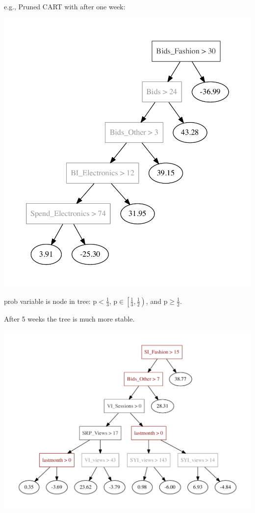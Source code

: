 \documentclass[11pt,xcolor=svgnames]{beamer}
\newcommand{\mr}[1]{\mathrm{#1}}
\begin{document}
\begin{frame}


e.g., Pruned CART with after one week:
\begin{center}
\includegraphics[width=.5\textwidth]{graphs/samptree_week1}
\end{center}
\hfill prob variable is node in tree: {\color{black!50} $\mr{p} <\tfrac{1}{3}$},
{\color{black!75}  $\mr{p} \in
\left[\tfrac{1}{3},\tfrac{1}{2}\right)$}, and {\color{DarkRed}  $\mr{p}
\geq \tfrac{1}{2}$}.
\end{frame}

\begin{frame}

After 5 weeks the tree is much more stable.
\begin{center}
\includegraphics[width=.9\textwidth]{graphs/samptree_week5}
\end{center}

\end{frame}
\end{document}
